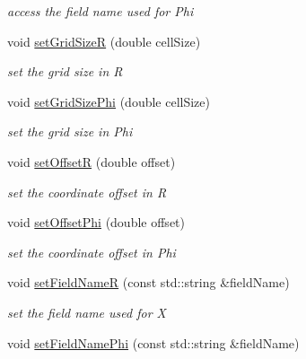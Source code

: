 \begin{DoxyCompactItemize}
\begin{DoxyCompactList}\small\item\em access the field name used for Phi \item\end{DoxyCompactList}\item 
void \hyperlink{class_d_d4hep_1_1_d_d_segmentation_1_1_polar_grid_r_phi_ab757b018648dc4207f94ab1d13d990ef}{setGridSizeR} (double cellSize)
\begin{DoxyCompactList}\small\item\em set the grid size in R \item\end{DoxyCompactList}\item 
void \hyperlink{class_d_d4hep_1_1_d_d_segmentation_1_1_polar_grid_r_phi_af50d9792d10242bbc70cbd07709bc82b}{setGridSizePhi} (double cellSize)
\begin{DoxyCompactList}\small\item\em set the grid size in Phi \item\end{DoxyCompactList}\item 
void \hyperlink{class_d_d4hep_1_1_d_d_segmentation_1_1_polar_grid_r_phi_ab3ee969820f45192085b4f8a51883dc4}{setOffsetR} (double offset)
\begin{DoxyCompactList}\small\item\em set the coordinate offset in R \item\end{DoxyCompactList}\item 
void \hyperlink{class_d_d4hep_1_1_d_d_segmentation_1_1_polar_grid_r_phi_a7724a483741721da3d8418623d75e351}{setOffsetPhi} (double offset)
\begin{DoxyCompactList}\small\item\em set the coordinate offset in Phi \item\end{DoxyCompactList}\item 
void \hyperlink{class_d_d4hep_1_1_d_d_segmentation_1_1_polar_grid_r_phi_a8ea0d5863004fc7dc74a592ed631cd36}{setFieldNameR} (const std::string \&fieldName)
\begin{DoxyCompactList}\small\item\em set the field name used for X \item\end{DoxyCompactList}\item 
void \hyperlink{class_d_d4hep_1_1_d_d_segmentation_1_1_polar_grid_r_phi_ae7613ded8629daf8dc2d23160b7f3206}{setFieldNamePhi} (const std::string \&fieldName)

\end{DoxyCompactItemize}

